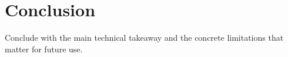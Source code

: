\section{Conclusion}

Conclude with the main technical takeaway and the concrete limitations that
matter for future use.
